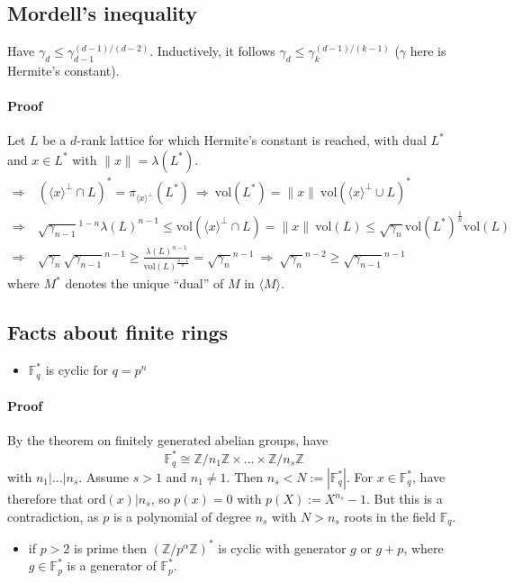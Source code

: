 \documentclass{scrartcl}
\newcommand{\Z}{\mathbb{Z}}
\newcommand{\vol}{\mathrm{vol}}
\begin{document}
\subsection{Mordell's inequality}
Have $\gamma_d \leq \gamma_{d-1}^{(d - 1) / (d - 2)}$. Inductively, it follows $\gamma_d \leq \gamma_k^{(d-1)/(k-1)}$ ($\gamma$ here is Hermite's constant).
\paragraph{Proof} Let $L$ be a $d$-rank lattice for which Hermite's constant is reached, with dual $L^*$ and $x \in L^*$ with $\|x\| = \lambda(L^*)$.
\begin{equation}
    \begin{split}
        \Rightarrow& \ \left(\langle x \rangle ^\perp \cap L\right)^* = \pi_{\langle x \rangle ^\perp} (L^*) \ \Rightarrow \ \vol(L^*) = \|x\| \ \vol\left(\langle x \rangle^\perp \cup L\right)^* \\
        \Rightarrow& \ \sqrt{\gamma_{n-1}}^{1-n} \lambda(L)^{n-1} \leq \vol\left(\langle x \rangle^\perp \cap L\right) = \|x\| \ \vol(L) \leq \sqrt{\gamma_n} \vol(L^*)^{\frac 1 n} \vol(L) \\
        \Rightarrow& \ \sqrt{\gamma_n} \sqrt{\gamma_{n - 1}}^{n - 1} \geq \frac {\lambda(L)^{n-1}} {\vol(L)^{\frac {n-1} n}} = \sqrt{\gamma_n}^{n-1} \ \Rightarrow \ \sqrt{\gamma_n}^{n-2} \geq \sqrt{\gamma_{n-1}}^{n-1}
    \end{split} \nonumber
\end{equation}
where $M^*$ denotes the unique ``dual'' of $M$ in $\langle M \rangle$.

\subsection{Facts about finite rings}
\begin{itemize}
    \item $\mathbb{F}_q^*$ is cyclic for $q = p^n$
\end{itemize}
\paragraph{Proof} By the theorem on finitely generated abelian groups, have
\begin{equation}
    \mathbb{F}_q^* \cong \Z/n_1\Z \times ... \times \Z/n_s\Z \nonumber
\end{equation}
with $n_1 | ... | n_s$. Assume $s > 1$ and $n_1 \neq 1$. Then $n_s < N := |\mathbb{F}_q^*|$. For $x \in \mathbb{F}_q^*$, have therefore that $\mathrm{ord}(x) | n_s$, so $p(x) = 0$ with $p(X) := X^{n_s} - 1$. 
But this is a contradiction, as $p$ is a polynomial of degree $n_s$ with $N > n_s$ roots in the field $\mathbb{F}_q$.
\begin{itemize}
    \item if $p > 2$ is prime then $(\Z/p^\alpha\Z)^*$ is cyclic with generator $g$ or $g + p$, where $g \in \mathbb{F}_p^*$ is a generator of $\mathbb{F}_p^*$.
\end{itemize}
\end{document}
